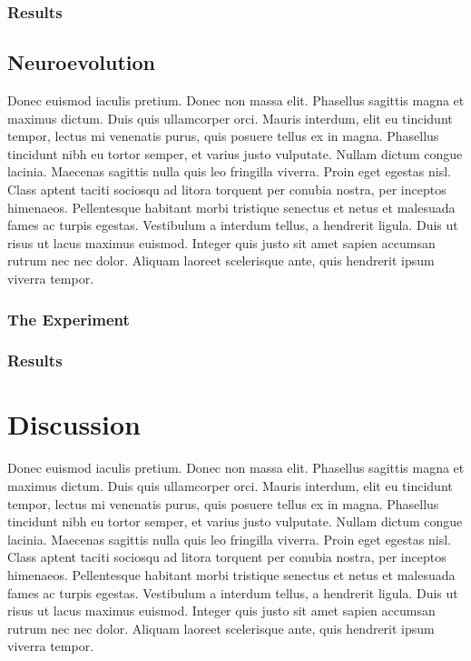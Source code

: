 \documentclass[format=acmsmall, review=false, screen=true]{acmart}
\begin{document}
\subsubsection{Results}

\subsection{Neuroevolution}

Donec euismod iaculis pretium. Donec non massa elit. Phasellus sagittis magna et maximus dictum. Duis quis ullamcorper orci. Mauris interdum, elit eu tincidunt tempor, lectus mi venenatis purus, quis posuere tellus ex in magna. Phasellus tincidunt nibh eu tortor semper, et varius justo vulputate. Nullam dictum congue lacinia. Maecenas sagittis nulla quis leo fringilla viverra. Proin eget egestas nisl. Class aptent taciti sociosqu ad litora torquent per conubia nostra, per inceptos himenaeos. Pellentesque habitant morbi tristique senectus et netus et malesuada fames ac turpis egestas. Vestibulum a interdum tellus, a hendrerit ligula. Duis ut risus ut lacus maximus euismod. Integer quis justo sit amet sapien accumsan rutrum nec nec dolor. Aliquam laoreet scelerisque ante, quis hendrerit ipsum viverra tempor.

\subsubsection{The Experiment}

\subsubsection{Results}

\section{Discussion}

Donec euismod iaculis pretium. Donec non massa elit. Phasellus sagittis magna et maximus dictum. Duis quis ullamcorper orci. Mauris interdum, elit eu tincidunt tempor, lectus mi venenatis purus, quis posuere tellus ex in magna. Phasellus tincidunt nibh eu tortor semper, et varius justo vulputate. Nullam dictum congue lacinia. Maecenas sagittis nulla quis leo fringilla viverra. Proin eget egestas nisl. Class aptent taciti sociosqu ad litora torquent per conubia nostra, per inceptos himenaeos. Pellentesque habitant morbi tristique senectus et netus et malesuada fames ac turpis egestas. Vestibulum a interdum tellus, a hendrerit ligula. Duis ut risus ut lacus maximus euismod. Integer quis justo sit amet sapien accumsan rutrum nec nec dolor. Aliquam laoreet scelerisque ante, quis hendrerit ipsum viverra tempor.
\end{document}
